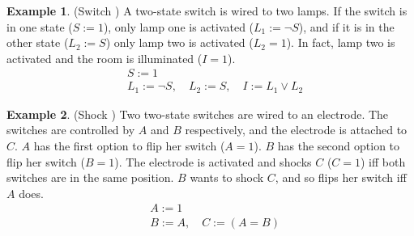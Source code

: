 \documentclass[11pt,a4paper]{book}
\theoremstyle{definition}
\theoremstyle{definition}
\newtheorem{example}{Example}[section]
\theoremstyle{definition}
\theoremstyle{remark}
\begin{document}
\begin{example}(Switch \cite{Weslake2015partialtheory})
A two-state switch is wired to two lamps. If the switch is in one state ($S:=1$), only lamp one is activated ($L_1:= \neg S$), and if it is in the other state ($L_2:= S$) only lamp two is activated ($L_2=1$). In fact, lamp two is activated and the room is illuminated ($I=1$).
\begin{equation*}
\begin{split}
&S:=1\\
& L_1:= \neg S, \quad L_2:=S, \quad I:= L_1 \lor L_2
\end{split}
\end{equation*}
\begin{center}
\end{center}
\end{example}



\begin{example}(Shock \cite{Weslake2015partialtheory})
Two two-state switches are wired to an electrode. The switches are controlled by $A$ and $B$ respectively, and the electrode is attached to $C$. $A$ has the first option to flip her switch ($A=1$). $B$ has the second option to flip her switch ($B=1$). The electrode is activated and shocks $C$ ($C=1$) iff both switches are in the same position. $B$ wants to shock $C$, and so flips her switch iff $A$ does.
\begin{equation*}
\begin{split}
&A:=1\\
& B:=A, \quad C:=(A=B)
\end{split}
\end{equation*}
\begin{center}
\end{center}
\end{example}
\end{document}
